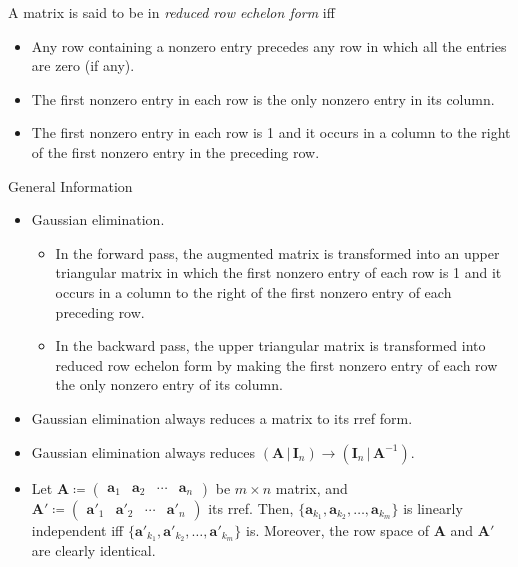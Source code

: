 \documentclass[../Notes.tex]{subfiles}
\begin{document}
\begin{definition}{}{}
    A matrix is said to be in \emph{reduced row echelon form} iff
        \begin{itemize}
            \item Any row containing a nonzero entry precedes any row in which all the entries are zero (if any).
            \item The first nonzero entry in each row is the only nonzero entry in its column.
            \item The first nonzero entry in each row is 1 and it occurs in a column to the right of the first nonzero entry in the preceding row.
        \end{itemize}
\end{definition}
\begin{stbox}{General Information}
    \begin{itemize}
        \item Gaussian elimination. 
        \begin{itemize}
            \item In the forward pass, the augmented matrix is transformed into an upper triangular matrix in which the first nonzero entry of each row is 1 and it occurs in a column to the right of the first nonzero entry
            of each preceding row.
            \item  In the backward pass, the upper triangular matrix is transformed into reduced row echelon form by making the first nonzero entry of each row the only nonzero entry of its column.
        \end{itemize}
        \item Gaussian elimination always reduces a matrix to its rref form.
        \item Gaussian elimination always reduces \((\mathbf{A} \,\vert\, \mathbf{I}_n)\to (\mathbf{I}_n \,\vert\, \mathbf{A}^{-1})\).
        \item Let \(\mathbf{A}\coloneq
        \begin{pmatrix}
            \mathbf{a}_1&\mathbf{a}_2&\cdots&\mathbf{a}_n
        \end{pmatrix}\) be \(m\times n\) matrix, and \(\mathbf{A}'\coloneq
        \begin{pmatrix}
            \mathbf{a}'_1&\mathbf{a}'_2&\cdots&\mathbf{a}'_n
        \end{pmatrix}\) its rref. Then, \(\{\mathbf{a}_{k_1},\mathbf{a}_{k_2},\dots,\mathbf{a}_{k_m}\}\) is linearly independent iff \(\{\mathbf{a}'_{k_1},\mathbf{a}'_{k_2},\dots,\mathbf{a}'_{k_m}\}\) is. Moreover, the row space of \(\mathbf{A}\) and \(\mathbf{A}'\) are clearly identical.

\end{itemize}
\end{stbox}
\end{document}
